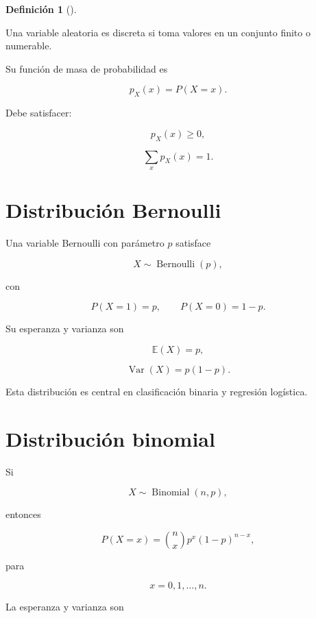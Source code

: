 \documentclass[
  spanish,
  10.5pt,
  letterpaper,
  DIV=11,
  numbers=noendperiod,
  oneside,
  open=any]{scrreprt}
\theoremstyle{definition}
\newtheorem{definition}{Definición}[chapter]
\theoremstyle{definition}
\theoremstyle{plain}
\theoremstyle{remark}
\begin{document}

\begin{definition}[]\protect\hypertarget{def-variable-discreta}{}\label{def-variable-discreta}

Una variable aleatoria es discreta si toma valores en un conjunto finito
o numerable.

\end{definition}

Su función de masa de probabilidad es

\[
p_X(x)
=
P(X=x).
\]

Debe satisfacer:

\[
p_X(x)\geq 0,
\]

\[
\sum_x p_X(x)=1.
\]

\section*{Distribución Bernoulli}\label{distribuciuxf3n-bernoulli}


Una variable Bernoulli con parámetro \(p\) satisface

\[
X\sim\operatorname{Bernoulli}(p),
\]

con

\[
P(X=1)=p,
\qquad
P(X=0)=1-p.
\]

Su esperanza y varianza son

\[
\mathbb{E}(X)=p,
\]

\[
\operatorname{Var}(X)=p(1-p).
\]

Esta distribución es central en clasificación binaria y regresión
logística.

\section*{Distribución binomial}\label{distribuciuxf3n-binomial}


Si

\[
X\sim\operatorname{Binomial}(n,p),
\]

entonces

\[
P(X=x)
=
\binom{n}{x}
p^x(1-p)^{n-x},
\]

para

\[
x=0,1,\ldots,n.
\]

La esperanza y varianza son
\end{document}
